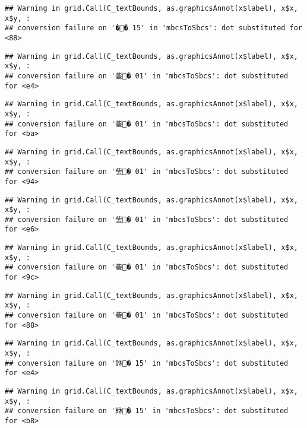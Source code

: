 \documentclass[]{article}
\begin{document}
\begin{verbatim}
## Warning in grid.Call(C_textBounds, as.graphicsAnnot(x$label), x$x, x$y, :
## conversion failure on '�� 15' in 'mbcsToSbcs': dot substituted for <88>
\end{verbatim}

\begin{verbatim}
## Warning in grid.Call(C_textBounds, as.graphicsAnnot(x$label), x$x, x$y, :
## conversion failure on '鈭� 01' in 'mbcsToSbcs': dot substituted for <e4>
\end{verbatim}

\begin{verbatim}
## Warning in grid.Call(C_textBounds, as.graphicsAnnot(x$label), x$x, x$y, :
## conversion failure on '鈭� 01' in 'mbcsToSbcs': dot substituted for <ba>
\end{verbatim}

\begin{verbatim}
## Warning in grid.Call(C_textBounds, as.graphicsAnnot(x$label), x$x, x$y, :
## conversion failure on '鈭� 01' in 'mbcsToSbcs': dot substituted for <94>
\end{verbatim}

\begin{verbatim}
## Warning in grid.Call(C_textBounds, as.graphicsAnnot(x$label), x$x, x$y, :
## conversion failure on '鈭� 01' in 'mbcsToSbcs': dot substituted for <e6>
\end{verbatim}

\begin{verbatim}
## Warning in grid.Call(C_textBounds, as.graphicsAnnot(x$label), x$x, x$y, :
## conversion failure on '鈭� 01' in 'mbcsToSbcs': dot substituted for <9c>
\end{verbatim}

\begin{verbatim}
## Warning in grid.Call(C_textBounds, as.graphicsAnnot(x$label), x$x, x$y, :
## conversion failure on '鈭� 01' in 'mbcsToSbcs': dot substituted for <88>
\end{verbatim}

\begin{verbatim}
## Warning in grid.Call(C_textBounds, as.graphicsAnnot(x$label), x$x, x$y, :
## conversion failure on '銝� 15' in 'mbcsToSbcs': dot substituted for <e4>
\end{verbatim}

\begin{verbatim}
## Warning in grid.Call(C_textBounds, as.graphicsAnnot(x$label), x$x, x$y, :
## conversion failure on '銝� 15' in 'mbcsToSbcs': dot substituted for <b8>
\end{verbatim}
\end{document}
